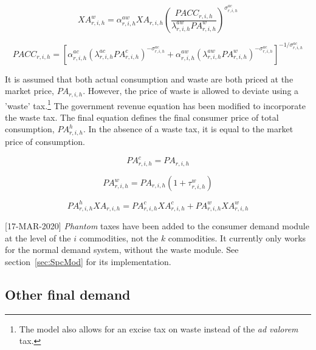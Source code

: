 \documentclass[11pt,letterpaper]{report}
\begin{document}
\begin{equation}
\label{eq:xaaw}
\mathit{XA}^{w}_{r,i,h} =
\alpha^{\mathit{aw}}_{r,i,h} \mathit{XA}_{r,i,h}
\left(
\frac{\mathit{PACC}_{r,i,h}}{\lambda^{\mathit{aw}}_{r,i,h} \mathit{PA}^{w}_{r,i,h}}
\right)^{\sigma^{\mathit{ac}}_{r,i,h}}
\end{equation}

\begin{equation}
\label{eq:pacc}
\mathit{PACC}_{r,i,h} = \left[
\alpha^{\mathit{ac}}_{r,i,h} \left(
\lambda^{\mathit{ac}}_{r,i,h} \mathit{PA}^{c}_{r,i,h}
\right)^{-\sigma^{\mathit{ac}}_{r,i,h}}
+ \alpha^{\mathit{aw}}_{r,i,h} \left(
\lambda^{\mathit{aw}}_{r,i,h} \mathit{PA}^{w}_{r,i,h}
\right)^{-\sigma^{\mathit{ac}}_{r,i,h}}
\right]^{-1/\sigma^{\mathit{ac}}_{r,i,h}}
\end{equation}

It is assumed that both actual consumption and
waste are both priced at the market price, $\mathit{PA}_{r,i,h}$. However, the price of waste
is allowed to deviate using a 'waste' tax.\footnote{The model also allows for an excise
	tax on waste instead of the \emph{ad valorem}
	tax.} The government revenue equation has
been modified to incorporate the waste tax.
The final equation defines the final consumer
price of total consumption, $\mathit{PA}^h_{r,i,h}$. In the absence
of a waste tax, it is equal to the market price
of consumption.

\begin{equation}
\label{eq:pac}
\mathit{PA}^{c}_{r,i,h} = \mathit{PA}_{r,i,h}
\end{equation}

\begin{equation}
\label{eq:paw}
\mathit{PA}^{w}_{r,i,h} = \mathit{PA}_{r,i,h}\left(1+\tau^w_{r,i,h}\right)
\end{equation}

\begin{equation}
\label{eq:pah}
\mathit{PA}^{h}_{r,i,h} \mathit{XA}_{r,i,h} =
\mathit{PA}^{c}_{r,i,h}\mathit{XA}^{c}_{r,i,h} +
\mathit{PA}^{w}_{r,i,h}\mathit{XA}^{w}_{r,i,h}
\end{equation}

[17-MAR-2020] \emph{Phantom} taxes have been added to
the consumer demand module at the level of the $i$ commodities,
not the $k$ commodities. It currently only works for the normal
demand system, without the waste module. See section~\ref{sec:SpcMod}
for its implementation.

\subsection{Other final demand}
\end{document}
